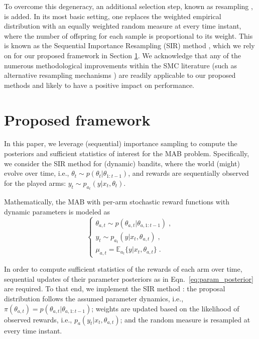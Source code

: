 \documentclass{article}
\newcommand{\ie}{i.e., }
\begin{document}
To overcome this degeneracy, an additional selection step, known as resampling \cite{j-Li2015}, is added. In its most basic setting, one replaces the weighted empirical distribution with an equally weighted random measure at every time instant, where the number of offspring for each sample is proportional to its weight. This is known as the Sequential Importance Resampling (SIR) method \cite{j-Gordon1993}, which we rely on for our proposed framework in Section \ref{sec:proposed_framework}. We acknowledge that any of the numerous methodological improvements within the SMC literature (such as alternative resampling mechanisms \cite{j-Li2015,j-Martino2017}) are readily applicable to our proposed methods and likely to have a positive impact on performance.

\section{Proposed framework}
\label{sec:proposed_framework}

In this paper, we leverage (sequential) importance sampling to compute the posteriors and sufficient statistics of interest for the MAB problem. Specifically, we consider the SIR method for (dynamic) bandits, where the world (might) evolve over time, \ie $\theta_t \sim p(\theta_t|\theta_{1:t-1})$, and rewards are sequentially observed for the played arms: $y_t\sim p_{a_t}(y|x_t,\theta_t)$.

Mathematically, the MAB with per-arm stochastic reward functions with dynamic parameters is modeled as
\begin{equation}
\begin{cases}
\theta_{a,t} \sim p(\theta_{a,t}|\theta_{a,1:t-1}) \; ,\\
y_t\sim p_{a_t}(y|x_t,\theta_{a,t}) \; , \\
\mu_{a,t}=\mathbb{E}_{a_t}\{y|x_t,\theta_{a,t}\} \; .
\end{cases}
\end{equation}

In order to compute sufficient statistics of the rewards of each arm over time, sequential updates of their parameter posteriors as in Eqn.~\eqref{eq:param_posterior} are required. To that end, we implement the SIR method \cite{j-Gordon1993}: the proposal distribution follows the assumed parameter dynamics, \ie $\pi(\theta_{a,t})=p(\theta_{a,t}|\theta_{a,1:t-1})$; weights are updated based on the likelihood of observed rewards, \ie $p_a(y_t|x_t,\theta_{a,t})$; and the random measure is resampled at every time instant.
\end{document}
